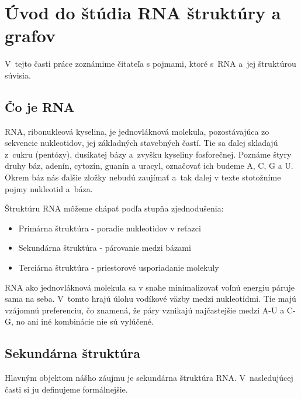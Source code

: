 \renewcommand{\SS}{\mathbb{S}}
\newcommand{\Par}[2]{\mbox{$( #1, #2 )$}}

\newcommand{\tree}[1]{\ensuremath{#1}}

\chapter{Úvod do štúdia RNA štruktúry a grafov}

V~tejto časti práce zoznámime čitateľa s pojmami, ktoré s~RNA a~jej
štruktúrou súvisia.




\section{Čo je RNA}

RNA, ribonukleová kyselina, je jednovláknová molekula, pozostávajúca
zo sekvencie nukleotidov, jej základných stavebných častí.
Tie sa ďalej skladajú z~cukru (pentózy), dusíkatej bázy a~zvyšku
kyseliny fosforečnej. Poznáme štyry druhy báz,
adenín, cytozín, guanín a uracyl, označovať ich budeme A, C, G a U.
Okrem báz nás ďalšie zložky nebudú zaujímať a~tak ďalej v texte stotožníme
pojmy nukleotid a~báza.

Štruktúru RNA môžeme chápať podľa stupňa zjednodušenia:
\begin{itemize}
  \item Primárna štruktúra - poradie nukleotidov v reťazci
  \item Sekundárna štruktúra - párovanie medzi bázami
  \item Terciárna štruktúra - priestorové usporiadanie molekuly
\end{itemize}

RNA ako jednovláknová molekula sa v snahe minimalizovať voľnú energiu páruje sama na seba.
V~tomto hrajú úlohu vodíkové väzby medzi nukleotidmi. Tie majú vzájomnú preferenciu,
čo znamená, že páry vznikajú najčastejšie medzi A-U a C-G, no ani iné
kombinácie nie sú vylúčené. 




\section{Sekundárna štruktúra}

Hlavným objektom nášho záujmu je sekundárna štruktúra RNA. V~nasledujúcej
časti si ju definujeme formálnejšie.

